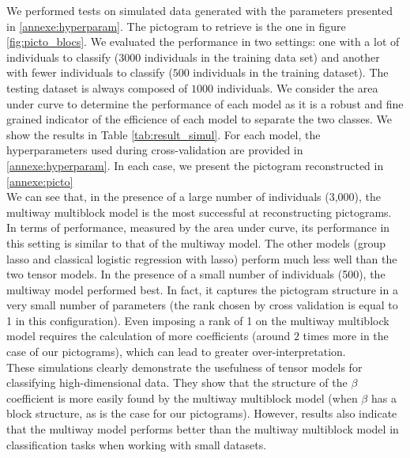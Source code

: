 \documentclass[preprint,12pt]{elsarticle}
\begin{document}
\noindent We performed tests on simulated data generated with the parameters presented in \ref{annexe:hyperparam}. The pictogram to retrieve is the one in figure \ref{fig:picto_blocs}. We evaluated the performance in two settings: one with a lot of individuals to classify ($3000$ individuals in the training data set) and another with fewer individuals to classify ($500$ individuals in the training dataset). The testing dataset is always composed of $1000$ individuals. We consider the area under curve to determine the performance of each model as it is a robust and fine grained indicator of the efficience of each model to separate the two classes. We show the results in Table \ref{tab:result_simul}. For each model, the hyperparameters used during cross-validation are provided in \ref{annexe:hyperparam}. In each case, we present the pictogram reconstructed in \ref{annexe:picto}\\
\indent We can see that, in the presence of a large number of individuals (3,000), the multiway multiblock model is the most successful at reconstructing pictograms. In terms of performance, measured by the area under curve, its performance in this setting is similar to that of the multiway model. The other models (group lasso and classical logistic regression with lasso) perform much less well than the two tensor models.
In the presence of a small number of individuals (500), the multiway model performed best. In fact, it captures the pictogram structure in a very small number of parameters (the rank chosen by cross validation is equal to 1 in this configuration). Even imposing a rank of 1 on the multiway multiblock model requires the calculation of more coefficients (around $2$ times more in the case of our pictograms), which can lead to greater over-interpretation.\\
\indent These simulations clearly demonstrate the usefulness of tensor models for classifying high-dimensional data. They show that the structure of the $\beta$ coefficient is more easily found by the multiway multiblock model (when $\beta$ has a block structure, as is the case for our pictograms). However, results also indicate that the multiway model performs better than the multiway multiblock model in classification tasks when working with small datasets.\\
\end{document}
